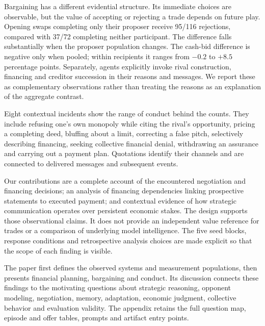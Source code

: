 Bargaining has a different evidential structure. Its immediate choices are observable, but the value of accepting or rejecting a trade depends on future play. Opening swaps completing only their proposer receive 95/116 rejections, compared with 37/72 completing neither participant. The difference falls substantially when the proposer population changes. The cash-bid difference is negative only when pooled; within recipients it ranges from $-0.2$ to $+8.5$ percentage points. Separately, agents explicitly invoke rival construction, financing and creditor succession in their reasons and messages. We report these as complementary observations rather than treating the reasons as an explanation of the aggregate contrast.

Eight contextual incidents show the range of conduct behind the counts. They include refusing one's own monopoly while citing the rival's opportunity, pricing a completing deed, bluffing about a limit, correcting a false pitch, selectively describing financing, seeking collective financial denial, withdrawing an assurance and carrying out a payment plan. Quotations identify their channels and are connected to delivered messages and subsequent events.

Our contributions are a complete account of the encountered negotiation and financing decisions; an analysis of financing dependencies linking prospective statements to executed payment; and contextual evidence of how strategic communication operates over persistent economic stakes. The design supports those observational claims. It does not provide an independent value reference for trades or a comparison of underlying model intelligence. The five seed blocks, response conditions and retrospective analysis choices are made explicit so that the scope of each finding is visible.

The paper first defines the observed systems and measurement populations, then presents financial planning, bargaining and conduct. Its discussion connects these findings to the motivating questions about strategic reasoning, opponent modeling, negotiation, memory, adaptation, economic judgment, collective behavior and evaluation validity. The appendix retains the full question map, episode and offer tables, prompts and artifact entry points.
